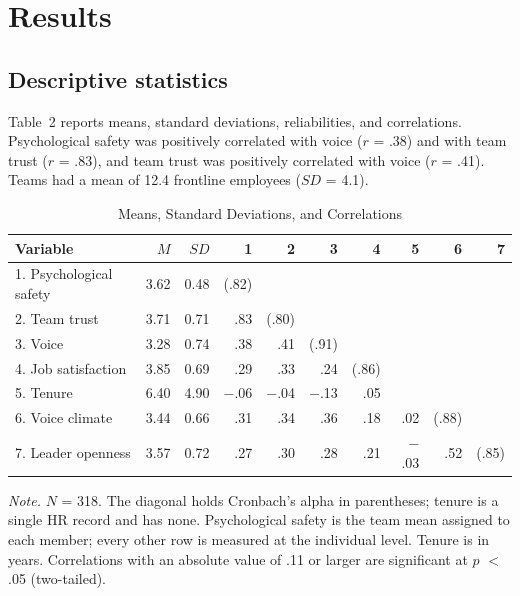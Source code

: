 \documentclass[11pt]{article}
\begin{document}
\section{Results}

\subsection{Descriptive statistics}

Table~2 reports means, standard deviations, reliabilities, and correlations. Psychological safety was positively correlated with voice ($r$ = .38) and with team trust ($r$ = .83), and team trust was positively correlated with voice ($r$ = .41). Teams had a mean of 12.4 frontline employees ($SD$ = 4.1).

\begin{table}[ht]
\centering
\begin{threeparttable}
\caption{Means, Standard Deviations, and Correlations}
\small
\begin{tabular}{lrrrrrrrrr}
\toprule
Variable & $M$ & $SD$ & 1 & 2 & 3 & 4 & 5 & 6 & 7 \\
\midrule
1. Psychological safety & 3.62 & 0.48 & (.82) & & & & & & \\
2. Team trust & 3.71 & 0.71 & .83 & (.80) & & & & & \\
3. Voice & 3.28 & 0.74 & .38 & .41 & (.91) & & & & \\
4. Job satisfaction & 3.85 & 0.69 & .29 & .33 & .24 & (.86) & & & \\
5. Tenure & 6.40 & 4.90 & $-$.06 & $-$.04 & $-$.13 & .05 & & & \\
6. Voice climate & 3.44 & 0.66 & .31 & .34 & .36 & .18 & .02 & (.88) & \\
7. Leader openness & 3.57 & 0.72 & .27 & .30 & .28 & .21 & $-$.03 & .52 & (.85) \\
\bottomrule
\end{tabular}
\begin{tablenotes}\footnotesize
\item \textit{Note.} $N$ = 318. The diagonal holds Cronbach's alpha in parentheses; tenure is a single HR record and has none. Psychological safety is the team mean assigned to each member; every other row is measured at the individual level. Tenure is in years. Correlations with an absolute value of .11 or larger are significant at $p$ $<$ .05 (two-tailed).
\end{tablenotes}
\end{threeparttable}
\end{table}
\end{document}
